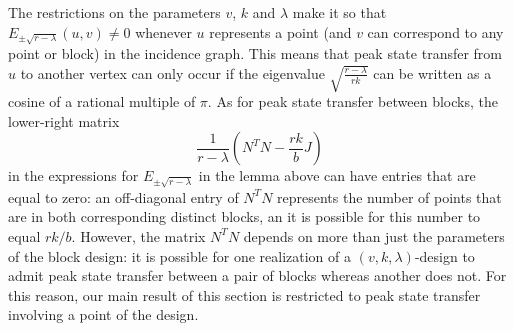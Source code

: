 \documentclass{article}
\numberwithin{equation}{section}
\begin{document}
The restrictions on the parameters $v$, $k$ and $\lambda$ make it so that $E_{\pm \sqrt{r-\lambda}}(u,v) \neq 0$
whenever $u$ represents a point (and $v$ can correspond to any point or block) in the incidence graph. This means that peak state transfer from $u$ to another vertex can only occur if the eigenvalue $\sqrt{\frac{r-\lambda}{rk}}$ can be written as a cosine of a rational multiple of $\pi$. As for peak state transfer between blocks, the lower-right matrix
\[
\frac{1}{r-\lambda}\left(N^TN - \frac{rk}{b}J\right)
\]
in the expressions for $E_{\pm \sqrt{r-\lambda}}$ in the lemma above can have entries that are equal to zero: an off-diagonal entry of $N^TN$ represents the number of points that are in both corresponding distinct blocks, an it is possible for this number to equal $rk/b$. However, the matrix $N^T N$ depends on more than just the parameters of the block design: it is possible for one realization of a $(v,k,\lambda)$-design to admit peak state transfer between a pair of blocks whereas another does not. For this reason, our main result of this section is restricted to peak state transfer involving a point of the design.
\end{document}
